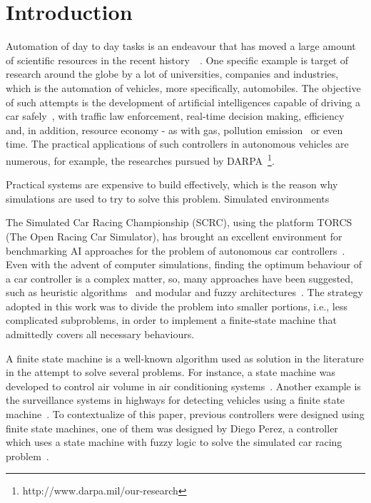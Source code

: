 \section{\textbf{Introduction}} \label{sec:Intro}
	
	Automation of day to day tasks is an endeavour that has moved a large amount of scientific resources in the recent history~\cite{INDUS}~\cite{APPLI}. One specific example is target of research around the globe by a lot of universities, companies	and industries, which is the automation of vehicles, more specifically, automobiles. The objective of such attempts is the development of artificial intelligences capable of driving a car safely~\cite{SAFE}, with traffic law enforcement, real-time decision making, efficiency and, in addition, resource economy - as with gas, pollution emission~\cite{AUTOM} or even time. The practical applications of such controllers in autonomous vehicles are numerous, for example, the researches pursued by DARPA~\footnote{http://www.darpa.mil/our-research}.
	
	Practical systems are expensive to build effectively, which is the reason why simulations are used to try to solve this problem. Simulated environments 

	The Simulated Car Racing Championship (SCRC), using the platform TORCS (The Open Racing Car Simulator), has	brought an excellent environment for benchmarking AI approaches for the problem of autonomous car controllers~\cite{2009}. Even with the advent of computer simulations, finding the optimum behaviour of a car controller is a complex matter, so, many approaches have been suggested, such as heuristic algorithms~\cite{MrRacer} and modular and fuzzy architectures~\cite{AUTOPIA}. The strategy adopted in this work was to divide the problem into smaller portions, i.e., less complicated subproblems, in order to implement a finite-state machine that admittedly covers all necessary behaviours.

    A finite state machine is a well-known algorithm used as solution in the literature in the attempt to solve several problems. For instance, a state machine was developed to control air volume in air conditioning systems~\cite{BERNARD}. Another example is the surveillance systems in highways for detecting vehicles using a finite state machine~\cite{DOHYUN}. To contextualize of this paper, previous controllers were designed using finite state machines, one of them was designed by Diego Perez, a controller which uses a state machine with fuzzy logic to solve the simulated car racing problem~\cite{DIEGO}.
	

